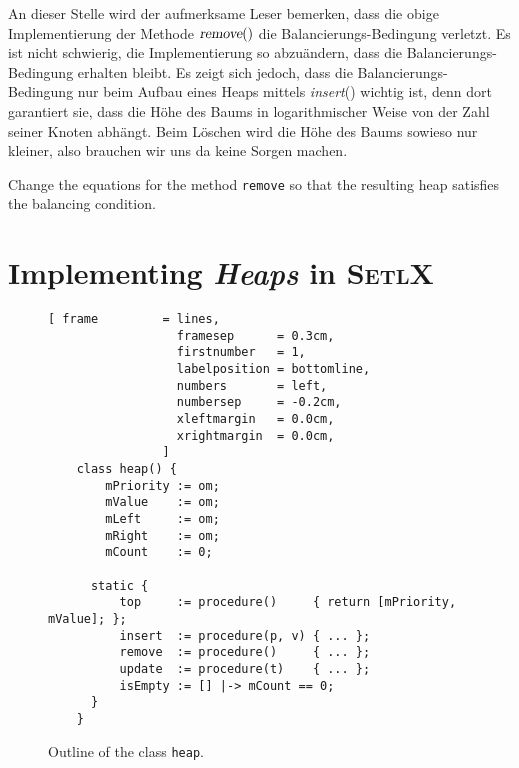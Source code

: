 An dieser Stelle wird der aufmerksame Leser bemerken, dass die obige
Implementierung der Methode $\textsl{remove}()$ die Balancierungs-Bedingung verletzt.
Es ist nicht schwierig, die Implementierung so abzu\"andern, dass die
Balancierungs-Bedingung erhalten bleibt. Es zeigt sich jedoch, dass die
Balancierungs-Bedingung  nur beim Aufbau eines Heaps mittels \textsl{insert}() wichtig ist,
denn dort garantiert sie, dass die H\"ohe des Baums in logarithmischer Weise von der Zahl
seiner Knoten abh\"angt.  Beim L\"oschen wird die H\"ohe des Baums sowieso nur kleiner, also
brauchen wir uns da keine Sorgen machen.

\exercise
Change the equations for the method \texttt{remove} so that the resulting heap satisfies the
balancing condition.



\section[Implementation]{Implementing \textsl{Heaps} in \textsc{SetlX}}

\begin{figure}[bt]
\centering
\begin{Verbatim}[ frame         = lines, 
                  framesep      = 0.3cm, 
                  firstnumber   = 1,
                  labelposition = bottomline,
                  numbers       = left,
                  numbersep     = -0.2cm,
                  xleftmargin   = 0.0cm,
                  xrightmargin  = 0.0cm,
                ]
    class heap() {
        mPriority := om;
        mValue    := om;
        mLeft     := om;
        mRight    := om;
        mCount    := 0;
    
      static {
          top     := procedure()     { return [mPriority, mValue]; };
          insert  := procedure(p, v) { ... };
          remove  := procedure()     { ... };
          update  := procedure(t)    { ... };
          isEmpty := [] |-> mCount == 0;
      }
    }
\end{Verbatim}
\vspace*{-0.3cm}
\caption{Outline of the class \texttt{heap}.}
\label{fig:heap.stlx-outline}
\end{figure}

